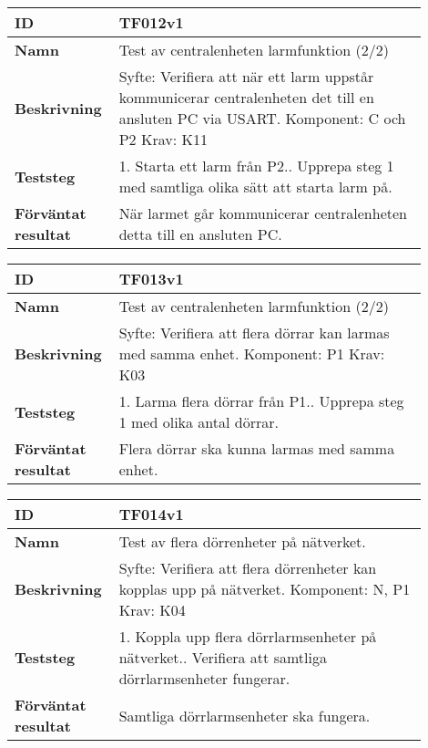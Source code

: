 \begin{table}[h!]
\begin{tabular}{| p{0.18\linewidth} | p{0.72\linewidth} |}
\hline
\textbf{ID} & TF012v1 \\ \hline
\textbf{Namn} & Test av centralenheten larmfunktion (2/2)
\\ \hline
\textbf{Beskrivning} &
Syfte: Verifiera att när ett larm uppstår kommunicerar centralenheten det till en ansluten PC via USART. \newline
Komponent: C och P2\newline
Krav: K11
\\ \hline
\textbf{Teststeg} &
1. Starta ett larm från P2.\newline
2. Upprepa steg 1 med samtliga olika sätt att starta larm på.
\\ \hline
\textbf{Förväntat resultat} & När larmet går kommunicerar centralenheten detta till en ansluten PC.
\\ \hline
\end{tabular}
\end{table}

\begin{table}[h!]
\begin{tabular}{| p{0.18\linewidth} | p{0.72\linewidth} |}
\hline
\textbf{ID} & TF013v1 \\ \hline
\textbf{Namn} & Test av centralenheten larmfunktion (2/2)
\\ \hline
\textbf{Beskrivning} &
Syfte: Verifiera att flera dörrar kan larmas med samma enhet.\newline
Komponent: P1\newline
Krav: K03
\\ \hline
\textbf{Teststeg} &
1. Larma flera dörrar från P1.\newline
2. Upprepa steg 1 med olika antal dörrar.
\\ \hline
\textbf{Förväntat resultat} & Flera dörrar ska kunna larmas med samma enhet.
\\ \hline
\end{tabular}
\end{table}

\begin{table}[h!]
\begin{tabular}{| p{0.18\linewidth} | p{0.72\linewidth} |}
\hline
\textbf{ID} & TF014v1 \\ \hline
\textbf{Namn} & 
Test av flera dörrenheter på nätverket.
\\ \hline
\textbf{Beskrivning} &
Syfte: Verifiera att flera dörrenheter kan kopplas upp på nätverket.\newline
Komponent: N, P1\newline
Krav: K04
\\ \hline
\textbf{Teststeg} &
1. Koppla upp flera dörrlarmsenheter på nätverket.\newline
2. Verifiera att samtliga dörrlarmsenheter fungerar.
\\ \hline
\textbf{Förväntat resultat} & Samtliga dörrlarmsenheter ska fungera.
\\ \hline
\end{tabular}
\end{table}

